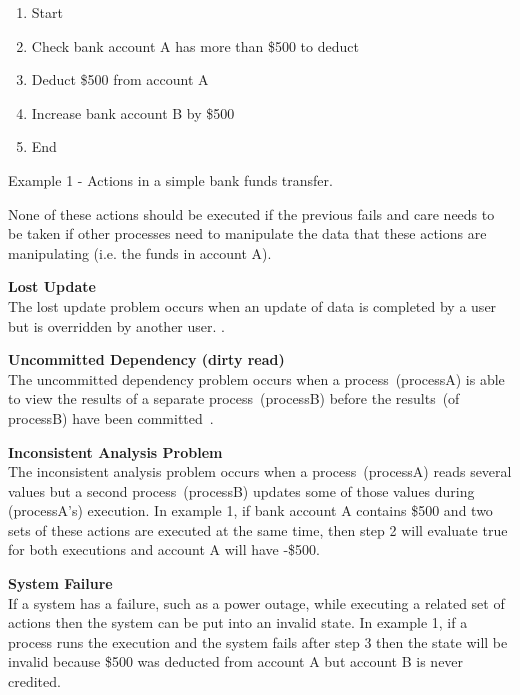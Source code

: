 \documentclass[a4paper,12pt]{article}
\newenvironment{boxit}{\begin{lrbox}{\savepar}
        \begin{minipage}[b]{4.6in}}
        {\end{minipage}\end{lrbox}\fbox{\usebox{\savepar}}}
\begin{document}
\begin{center}
    \begin{boxit}
        \begin{center}
               \begin{enumerate}
                    \item{Start}
                    \item{Check bank account A has more than \$500 to deduct}
                    \item{Deduct \$500 from account A}
                    \item{Increase bank account B by \$500}
                    \item{End}
                \end{enumerate}
        \end{center}
    \end{boxit}
\end{center}
\begin{center}
    Example 1 - Actions in a simple bank funds transfer.
\end{center}
None of these actions should be executed if the previous fails and care needs to be taken if other processes need to manipulate the data that these actions are manipulating (i.e. the funds in account A).

\par\textbf{\indent Lost Update}\\
The lost update problem occurs when an update of data is completed by a user but is overridden by another user.
\citep{database-systems}.

\par\textbf{\indent Uncommitted Dependency (dirty read)}\\
The uncommitted dependency problem occurs when a process~(processA) is able to view the results of a separate process~(processB) before the results~(of processB) have been committed~\citep{database-systems}.

\par\textbf{\indent Inconsistent Analysis Problem}\\
The inconsistent analysis problem occurs when a process~(processA) reads several values but a second process~(processB) updates some of those values during (processA's) execution.
In example 1, if bank account A contains \$500 and two sets of these actions are executed at the same time, then step 2 will evaluate true for both executions and account A will have -\$500.

\par\textbf{\indent System Failure}\\
If a system has a failure, such as a power outage, while executing a related set of actions then the system can be put into an invalid state. 
In example 1, if a process runs the execution and the system fails after step 3 then the state will be invalid because \$500 was deducted from account A but account B is never credited.
\end{document}
